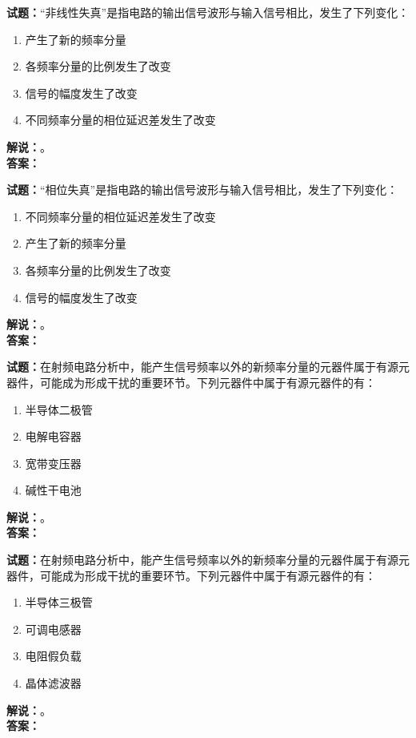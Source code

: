 \documentclass{ctexbook}
\begin{document}
\bigskip

\noindent\textbf{试题：}“非线性失真”是指电路的输出信号波形与输入信号相比，发生了下列变化：
\begin{enumerate}[leftmargin=3em]
  \item 产生了新的频率分量
  \item 各频率分量的比例发生了改变
  \item 信号的幅度发生了改变
  \item 不同频率分量的相位延迟差发生了改变
\end{enumerate}
\noindent\textbf{解说：}\textbf{}。\\\noindent\textbf{答案：}

\bigskip

\noindent\textbf{试题：}“相位失真”是指电路的输出信号波形与输入信号相比，发生了下列变化：
\begin{enumerate}[leftmargin=3em]
  \item 不同频率分量的相位延迟差发生了改变
  \item 产生了新的频率分量
  \item 各频率分量的比例发生了改变
  \item 信号的幅度发生了改变
\end{enumerate}
\noindent\textbf{解说：}\textbf{}。\\\noindent\textbf{答案：}

\bigskip

\noindent\textbf{试题：}在射频电路分析中，能产生信号频率以外的新频率分量的元器件属于有源元器件，可能成为形成干扰的重要环节。下列元器件中属于有源元器件的有：
\begin{enumerate}[leftmargin=3em]
  \item 半导体二极管
  \item 电解电容器
  \item 宽带变压器
  \item 碱性干电池
\end{enumerate}
\noindent\textbf{解说：}\textbf{}。\\\noindent\textbf{答案：}

\bigskip

\noindent\textbf{试题：}在射频电路分析中，能产生信号频率以外的新频率分量的元器件属于有源元器件，可能成为形成干扰的重要环节。下列元器件中属于有源元器件的有：
\begin{enumerate}[leftmargin=3em]
  \item 半导体三极管
  \item 可调电感器
  \item 电阻假负载
  \item 晶体滤波器
\end{enumerate}
\noindent\textbf{解说：}\textbf{}。\\\noindent\textbf{答案：}
\end{document}
